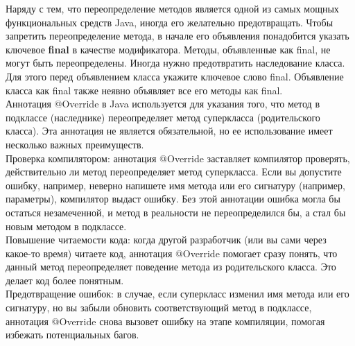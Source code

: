 Наряду с тем, что переопределение методов является одной из самых мощных функциональных средств Java, иногда его желательно предотвращать. Чтобы запретить переопределение метода, в начале его объявления понадобится указать ключевое \textbf{final} в качестве модификатора. Методы, объявленные как final, не могут быть переопределены. Иногда нужно предотвратить наследование класса. Для этого перед объявлением класса укажите ключевое слово final. Объявление класса как final также неявно объявляет все его методы как final. \\ 

\noindent Аннотация @Override в Java используется для указания того, что метод в подклассе (наследнике) переопределяет метод суперкласса (родительского класса). Эта аннотация не является обязательной, но ее использование имеет несколько важных преимуществ. \\
Проверка компилятором: аннотация @Override заставляет компилятор проверять, действительно ли метод переопределяет метод суперкласса. Если вы допустите ошибку, например, неверно напишете имя метода или его сигнатуру (например, параметры), компилятор выдаст ошибку. Без этой аннотации ошибка могла бы остаться незамеченной, и метод в реальности не переопределился бы, а стал бы новым методом в подклассе. \\
Повышение читаемости кода: когда другой разработчик (или вы сами через какое-то время) читаете код, аннотация @Override помогает сразу понять, что данный метод переопределяет поведение метода из родительского класса. Это делает код более понятным. \\
Предотвращение ошибок: в случае, если суперкласс изменил имя метода или его сигнатуру, но вы забыли обновить соответствующий метод в подклассе, аннотация @Override снова вызовет ошибку на этапе компиляции, помогая избежать потенциальных багов. \\

